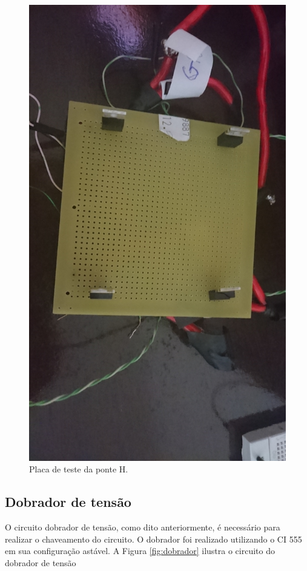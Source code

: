\begin{figure}[h!]
  \centering
  \includegraphics[scale=0.075]{figuras/TestePonteH.JPG}
  \caption{Placa de teste da ponte H.}
\end{figure}

\subsection{Dobrador de tensão}

O circuito dobrador de tensão, como dito anteriormente, é necessário para
realizar o chaveamento do circuito. O dobrador foi realizado utilizando o CI
555 em sua configuração astável. A Figura \ref{fig:dobrador} ilustra o circuito do dobrador de tensão

